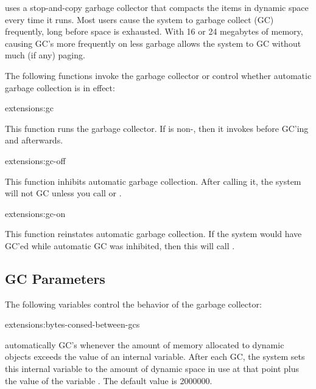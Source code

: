 \cmucl{} uses a stop-and-copy garbage collector that compacts
the items in dynamic space every time it runs. Most users cause the
system to garbage collect (GC) frequently, long before space is
exhausted. With 16 or 24 megabytes of memory, causing GC's more
frequently on less garbage allows the system to GC without much (if
any) paging.

The following functions invoke the garbage collector or control whether
automatic garbage collection is in effect:

\begin{defun}{extensions:}{gc}{}
  
  This function runs the garbage collector.  If
   is non-\nil, then it invokes
   before GC'ing and
   afterwards.
\end{defun}

\begin{defun}{extensions:}{gc-off}{}
  
  This function inhibits automatic garbage collection.  After calling
  it, the system will not GC unless you call  or
  .
\end{defun}

\begin{defun}{extensions:}{gc-on}{}
  
  This function reinstates automatic garbage collection.  If the
  system would have GC'ed while automatic GC was inhibited, then this
  will call .
\end{defun}


\subsection{GC Parameters}

The following variables control the behavior of the garbage collector:

\begin{defvar}{extensions:}{bytes-consed-between-gcs}
  
  \cmucl{} automatically GC's whenever the amount of memory
  allocated to dynamic objects exceeds the value of an internal
  variable.  After each GC, the system sets this internal variable to
  the amount of dynamic space in use at that point plus the value of
  the variable .  The default
  value is 2000000.
\end{defvar}

